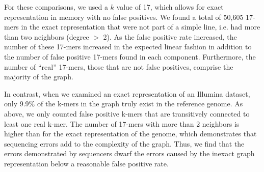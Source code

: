 \documentclass[12pt]{article} \usepackage{simplemargins}
\begin{document}
\begin{table}
\caption{An exact \emph{E. coli} genome representation of 17-mers was compared with 
two inexact ones as well as an exact and two inexact representations of an Illumina 
\emph{E. coli} dataset.}
\end{table}

For these comparisons, we used a $k$ value of 17, which allows for
exact representation in memory with no false positives. We found a
total of 50,605 17-mers in the exact representation that were not part
of a simple line, i.e. had more than two neighbors (degree $>$ 2). As
the false positive rate increased, the number of these 17-mers
increased in the expected linear fashion in addition to the number of
false positive 17-mers found in each component. Furthermore, the
number of ``real'' 17-mers, those that are not false positives,
comprise the majority of the graph.

In contrast, when we examined an exact representation of an Illumina
dataset, only 9.9\% of the k-mers in the graph truly exist in the
reference genome.  As above, we only counted false positive k-mers
that are transitively connected to least one real k-mer. The number of
17-mers with more than 2 neighbors is higher than for the exact
representation of the genome, which demonstrates that sequencing
errors add to the complexity of the graph. Thus, we find that the
errors demonstrated by sequencers dwarf the errors caused by the
inexact graph representation below a reasonable false positive rate.
\end{document}
